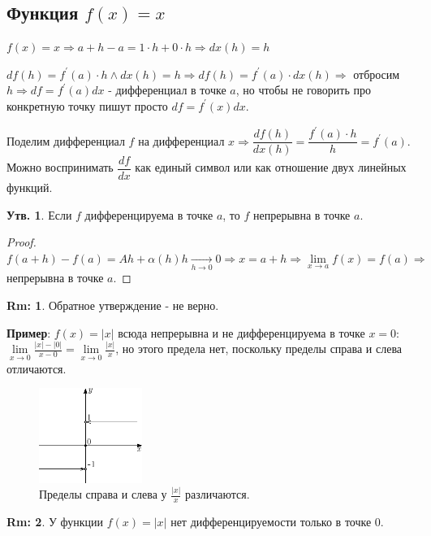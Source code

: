 \documentclass[12pt]{article}
\theoremstyle{definition}
\newtheorem{rem}{Rm:}
\newtheorem{prop}{Утв.}
\begin{document}
\subsection*{Функция $f(x) = x$}

$f(x) = x \Rightarrow a+h -a = 1{\cdot}h + 0{\cdot}h \Rightarrow dx(h) = h$

$df(h) = f^\prime(a){\cdot}h \wedge dx(h) = h \Rightarrow df(h) = f^\prime(a){\cdot}dx(h) \Rightarrow$ отбросим $h \Rightarrow df = f^\prime(a)dx$ - дифференциал в точке $a$, но чтобы не говорить про конкретную точку пишут просто $df = f^\prime(x)dx$.

Поделим дифференциал $f$ на дифференциал $x \Rightarrow \dfrac{df(h)}{dx(h)} = \dfrac{ f^\prime(a){\cdot}h}{h} = f^\prime(a)$. Можно воспринимать $\dfrac{df}{dx}$ как единый символ или как отношение двух линейных функций.

\begin{prop}
	Если $f$ дифференцируема в точке $a$, то $f$ непрерывна в точке $a$.
\end{prop}
\begin{proof}
	$f(a+h) - f(a) = Ah + \alpha(h)h \xrightarrow[h \to 0]{}0 \Rightarrow x = a + h \Rightarrow \lim\limits_{x\to a} f(x) = f(a) \Rightarrow$ непрерывна в точке $a$.
\end{proof}

\begin{rem}
	Обратное утверждение - не верно.
\end{rem}

\textbf{Пример}: $f(x) = |x|$ всюда непрерывна и не дифференцируема в точке $x = 0$: $\lim\limits_{x \to 0}\frac{|x| - |0|}{x - 0} =\lim\limits_{x \to 0}\frac{|x|}{x}$, но этого предела нет, поскольку пределы справа и слева отличаются.

\begin{figure}[H]
	\centering
	\includegraphics[width=0.3\textwidth]{22_2.eps}
	\caption{Пределы справа и слева у $\frac{|x|}{x}$ различаются.}
	\label{22_2}
\end{figure}

\begin{rem}
	У функции $f(x) = |x|$ нет дифференцируемости только в точке $0$.
\end{rem}
\end{document}
